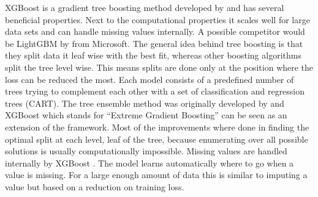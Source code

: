 XGBoost is a gradient tree boosting method developed by \citet{Chen_2016} and has several beneficial properties. Next to the computational properties it scales well for large data sets and can handle missing values internally. A possible competitor would be LightGBM by \citet{Ke2017LightGBMAH} from Microsoft. The general idea behind tree boosting is that they split data it leaf wise with the best fit, whereas other boosting algorithms split the tree level wise. This means splits are done only at the position where the loss can be reduced the most. Each model consists of a predefined number of trees trying to complement each other with a set of classification and regression trees (CART). The tree ensemble method was originally developed by \citet{friedman2001greedy} and XGBoost which stands for \enquote{Extreme Gradient Boosting} can be seen as an extension of the framework. Most of the improvements where done in finding the optimal split at each level, leaf of the tree, because enumerating over all possible solutions is usually computationally impossible. 
Missing values are handled internally by XGBoost \citep{Chen_2016}. The model learns automatically where to go when a value is missing. For a large enough amount of data this is similar to imputing a value but based on a reduction on training loss. 

